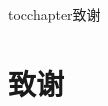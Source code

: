 
\newenvironment{theacknowledgements}{\wuhao\song}

\addcontentsline{toc}{chapter}{致谢}%
\chapter*{\centering\xiaosan\hei\bfseries 致\quad 谢}

\begin{theacknowledgements}
	






\end{theacknowledgements}





